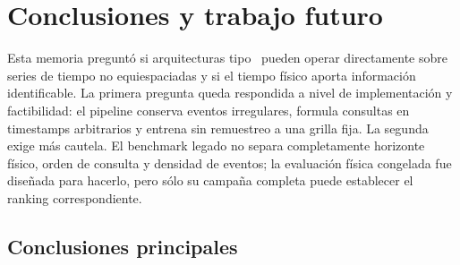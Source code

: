\chapter{Conclusiones y trabajo futuro}
\label{cap:conclusiones}

Esta memoria preguntó si arquitecturas tipo \Transformer\ pueden operar directamente sobre series de tiempo no equiespaciadas y si el tiempo físico aporta información identificable. La primera pregunta queda respondida a nivel de implementación y factibilidad: el pipeline conserva eventos irregulares, formula consultas en timestamps arbitrarios y entrena sin remuestreo a una grilla fija. La segunda exige más cautela. El benchmark legado no separa completamente horizonte físico, orden de consulta y densidad de eventos; la evaluación física congelada fue diseñada para hacerlo, pero sólo su campaña completa puede establecer el ranking correspondiente.

\section{Conclusiones principales}
\label{sec:conclusiones-principales}

